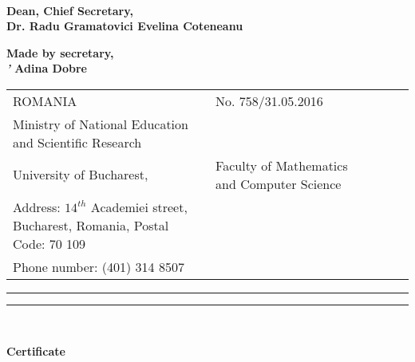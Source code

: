\documentclass[a4paper,9pt,final]{scrartcl}
\begin{document}
\vspace{50pt}
\paragraph{}
\begin{Large}
	\textbf{Dean,  \hfill Chief Secretary,\\
	Dr. Radu Gramatovici \hfill  Evelina Coteneanu
		}
\end{Large}


\vspace{75pt}
\begin{Large}
\hfill \textbf{Made by secretary,\\
\textit{'} \hfill Adina Dobre}
\end{Large}
\hfill
\newpage

\begin{tabular}{llcll}
	
	ROMANIA & \hfill No. 758/31.05.2016 \\
	Ministry of National Education and Scientific Research \\
	University of Bucharest, & 	Faculty of Mathematics and Computer Science \\
	Address: $14^{th}$ Academiei street, Bucharest, Romania, Postal Code: 70 109 \\
	Phone number: (401) 314 8507\\
	
	
		
\end{tabular}

\begin{center}

	
\hrule \hrule \hrulefill \\
\vspace{10pt}
	\begin{Huge}
		\textbf{Certificate}
	\end{Huge}
	
\end{center}
\end{document}
